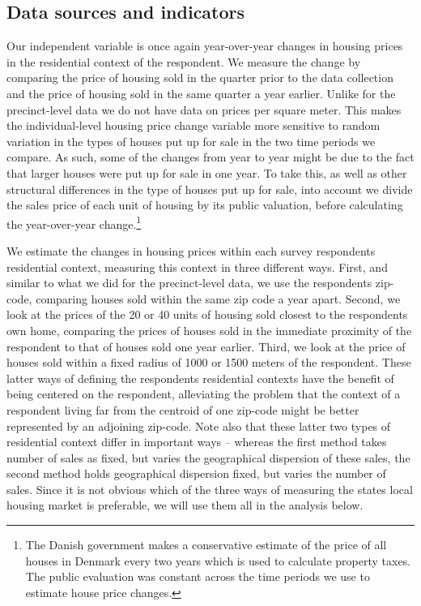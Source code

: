 \documentclass[12pt,a4paper]{article}
\begin{document}
\subsection{Data sources and indicators}
Our independent variable is once again year-over-year changes in housing prices in the residential context of the respondent. We measure the change by comparing the price of housing sold in the quarter prior to the data collection and the price of housing sold in the same quarter a year earlier. Unlike for the precinct-level data  we do not have data on prices per square meter. This makes the individual-level housing price change variable more sensitive to random variation in the types of houses put up for sale in the two time periods we compare. As such, some of the changes from year to year might be due to the fact that larger houses were put up for sale in one year. To take this, as well as other structural differences in the type of houses put up for sale, into account we divide the sales price of each unit of housing by its public valuation, before calculating the year-over-year change.\footnote{The Danish government makes a conservative estimate of the price of all houses in Denmark every two years which is used to calculate property taxes. The public evaluation was constant across the time periods we use to estimate house price changes.} 

We estimate the changes in housing prices within each survey respondents residential context, measuring this context  in three different ways. First, and similar to what we did for the precinct-level data, we use the respondents zip-code, comparing houses sold within the same zip code a year apart. Second, we look at the prices of the 20 or 40 units of housing sold closest to the respondents own home, comparing the prices of houses sold in the immediate proximity of the respondent to that of houses sold one year earlier. Third, we look at the price of houses sold within a fixed radius of 1000 or 1500 meters of the respondent. These latter ways of defining the respondents residential contexts have the benefit of being centered on the respondent, alleviating the problem that the context of a respondent living far from the centroid of one zip-code might be better represented by an adjoining zip-code. Note also that these latter two types of residential context differ in important ways -- whereas the first method takes number of sales as fixed, but varies the geographical dispersion of these sales, the second method holds geographical dispersion fixed, but varies the number of sales. Since it is not obvious which of the three ways of measuring the states local housing market is preferable, we will use them all in the analysis below.
\end{document}
